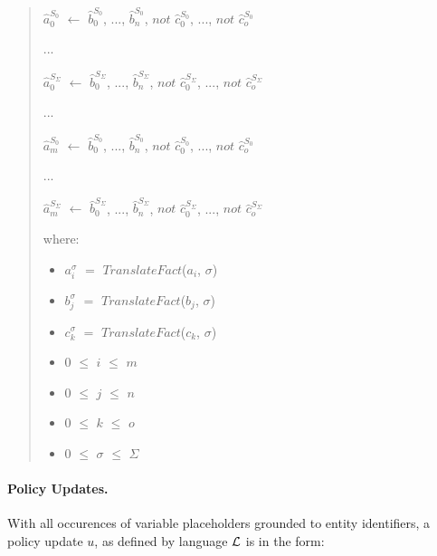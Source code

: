 \documentclass[10pt, twocolumn]{article}
\begin{document}
           \begin{quote}
            $\hat{a}^{S_{0}}_{0}$ $\leftarrow$
            $\hat{b}^{S_{0}}_{0}$, ..., $\hat{b}^{S_{0}}_{n}$,
            $not$ $\hat{c}^{S_{0}}_{0}$, ..., $not$ $\hat{c}^{S_{0}}_{o}$

            ...

            $\hat{a}^{S_{\Sigma}}_{0}$ $\leftarrow$
            $\hat{b}^{S_{\Sigma}}_{0}$, ..., $\hat{b}^{S_{\Sigma}}_{n}$,
            $not$ $\hat{c}^{S_{\Sigma}}_{0}$, ..., $not$ $\hat{c}^{S_{\Sigma}}_{o}$

            ...

            $\hat{a}^{S_{0}}_{m}$ $\leftarrow$
            $\hat{b}^{S_{0}}_{0}$, ..., $\hat{b}^{S_{0}}_{n}$,
            $not$ $\hat{c}^{S_{0}}_{0}$, ..., $not$ $\hat{c}^{S_{0}}_{o}$

            ...

            $\hat{a}^{S_{\Sigma}}_{m}$ $\leftarrow$
            $\hat{b}^{S_{\Sigma}}_{0}$, ..., $\hat{b}^{S_{\Sigma}}_{n}$,
            $not$ $\hat{c}^{S_{\Sigma}}_{0}$, ..., $not$ $\hat{c}^{S_{\Sigma}}_{o}$

            where:

            \begin{itemize}
              \item
                $a^{\sigma}_{i}$ $=$ $TranslateFact$($a_{i}$, $\sigma$)
              \item
                $b^{\sigma}_{j}$ $=$ $TranslateFact$($b_{j}$, $\sigma$)
              \item
                $c^{\sigma}_{k}$ $=$ $TranslateFact$($c_{k}$, $\sigma$)
              \item
                $0$ $\leq$ $i$ $\leq$ $m$
              \item
                $0$ $\leq$ $j$ $\leq$ $n$
              \item
                $0$ $\leq$ $k$ $\leq$ $o$
              \item
                $0$ $\leq$ $\sigma$ $\leq$ $\Sigma$
            \end{itemize}
          \end{quote}      

        \paragraph{Policy Updates.}

          With all occurences of variable placeholders grounded to entity
          identifiers, a policy update $u$, as defined by language ${\cal L}$
          is in the form:
\end{document}
